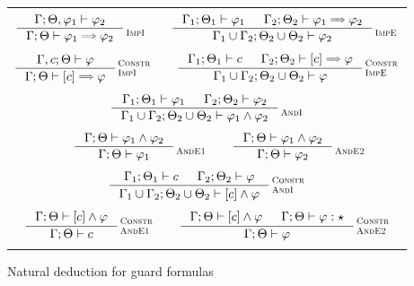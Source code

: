 \documentclass[english, mgr]{iithesis}
\newcommand{\scbrk}[2]{\myatop{\textsc{#1}}{\textsc{#2}}}
\begin{document}
\begin{figure}[htbp]
  \centering
  \begin{tabularx}{\textwidth}{|C|}
  \hline \\ $
  \inference{
    \jgmnt[\cEnv;\Theta,\formphi_1]{\formphi_2}
  }{
    \jgmnt[\cEnv;\Theta]{\formphi_1 \fImp \formphi_2}
  }\scbrk{}{ImpI}
  \qquad
  \inference{
    \jgmnt[\cEnv_1;\Theta_1]{\formphi_1} &
    \jgmnt[\cEnv_2;\Theta_2]{\formphi_1 \fImp \formphi_2}
    }{
    \jgmnt[\cEnv_1 \cup \cEnv_2;\Theta_2 \cup \Theta_2]{\formphi_2}
  }\scbrk{}{ImpE}
  $ \\ \\ $
  \inference{
    \jgmnt[\cEnv, \constr;\Theta]{\formphi}
  }{
    \jgmnt[\cEnv;\Theta]{\fCImp{\constr}\formphi}
  }\scbrk{Constr}{ImpI}
  \qquad
  \inference{
    \jgmnt[\cEnv_1;\Theta_1]{\constr} &
    \jgmnt[\cEnv_2;\Theta_2]{\fCImp{\constr}\formphi}
    }{
    \jgmnt[\cEnv_1 \cup \cEnv_2;\Theta_2 \cup \Theta_2]{\formphi}
  }\scbrk{Constr}{ImpE}
  $ \\ \\ $
  \inference{
    \jgmnt[\cEnv_1;\Theta_1]{\formphi_1} &
    \jgmnt[\cEnv_2;\Theta_2]{\formphi_2}
  }{
    \jgmnt[\cEnv_1 \cup \cEnv_2;\Theta_2 \cup \Theta_2]{\formphi_1 \wedge \formphi_2}
  }\scbrk{}{AndI}
  $ \\ \\ $
  \qquad
  \inference{
    \jgmnt[\cEnv;\Theta]{\formphi_1 \wedge \formphi_2}
    }{
    \jgmnt[\cEnv;\Theta]{\formphi_1}
  }\scbrk{}{AndE1}\qquad
  \inference{
    \jgmnt[\cEnv;\Theta]{\formphi_1 \wedge \formphi_2}
    }{
    \jgmnt[\cEnv;\Theta]{\formphi_2}
  }\scbrk{}{AndE2}
  $ \\ \\ $
  \inference{
    \jgmnt[\cEnv_1;\Theta_1]{\constr} &
    \jgmnt[\cEnv_2;\Theta_2]{\formphi}
  }{
    \jgmnt[\cEnv_1 \cup \cEnv_2;\Theta_2 \cup \Theta_2]{\fCAnd{\constr}\formphi}
  }\scbrk{Constr}{AndI}
  $ \\ \\ $
  \inference{
    \jgmnt[\cEnv;\Theta]{\fCAnd{\constr}\formphi}
    }{
    \jgmnt[\cEnv;\Theta]{\constr}
  }\scbrk{Constr}{AndE1}\qquad
  \inference{
    \jgmnt[\cEnv;\Theta]{\fCAnd{\constr}\formphi} &
    \jgmnt[\cEnv;\Theta]{\formphi: \kProp}
    }{
    \jgmnt[\cEnv;\Theta]{\formphi}
  }\scbrk{Constr}{AndE2}
  $ \\ \\ \hline
  \end{tabularx}
  \caption{Natural deduction for guard formulas}
  \label{fig:deduction}
\end{figure}
\end{document}
